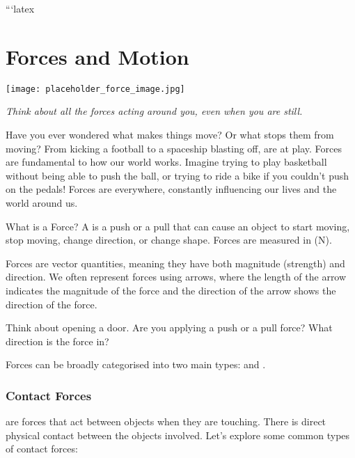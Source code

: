 ```latex
\chapter{Forces and Motion}

\begin{marginfigure}
\texttt{[image: placeholder\_force\_image.jpg]}
\caption*{\textit{Think about all the forces acting around you, even when you are still.}}
\end{marginfigure}

\FloatBarrier
\1

Have you ever wondered what makes things move? Or what stops them from moving?  From kicking a football to a spaceship blasting off,  are at play.  Forces are fundamental to how our world works.  Imagine trying to play basketball without being able to push the ball, or trying to ride a bike if you couldn't push on the pedals!  Forces are everywhere, constantly influencing our lives and the world around us.

\begin{keyconcept}{What is a Force?}
A  is a push or a pull that can cause an object to start moving, stop moving, change direction, or change shape. Forces are measured in  (N).
\end{keyconcept}

Forces are vector quantities, meaning they have both magnitude (strength) and direction. We often represent forces using arrows, where the length of the arrow indicates the magnitude of the force and the direction of the arrow shows the direction of the force.

\begin{stopandthink}
Think about opening a door.  Are you applying a push or a pull force? What direction is the force in?
\end{stopandthink}

Forces can be broadly categorised into two main types:  and .

\subsection{Contact Forces}

\begin{marginnote}
\end{marginnote}
 are forces that act between objects when they are touching.  There is direct physical contact between the objects involved.  Let's explore some common types of contact forces:

